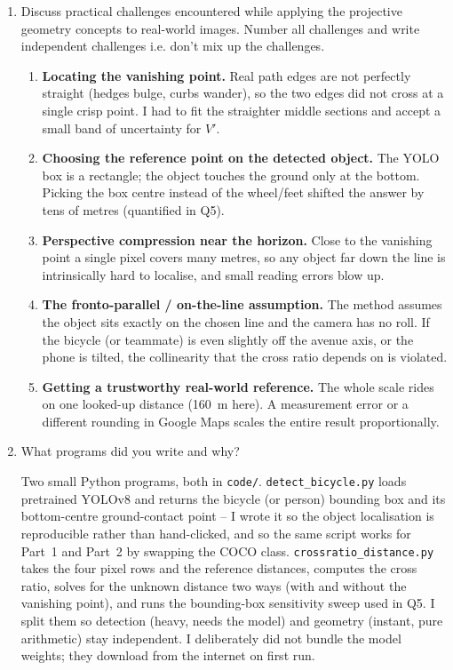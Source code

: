 \begin{enumerate}
\item Discuss practical challenges encountered while applying the projective
geometry concepts to real-world images. Number all challenges and write independent challenges i.e. don't mix up the challenges.
\begin{studentSpace}
\begin{enumerate}
\item \textbf{Locating the vanishing point.} Real path edges are not
perfectly straight (hedges bulge, curbs wander), so the two edges did not
cross at a single crisp point. I had to fit the straighter middle
sections and accept a small band of uncertainty for $V'$.
\item \textbf{Choosing the reference point on the detected object.} The
YOLO box is a rectangle; the object touches the ground only at the
bottom. Picking the box centre instead of the wheel/feet shifted the
answer by tens of metres (quantified in Q5).
\item \textbf{Perspective compression near the horizon.} Close to the
vanishing point a single pixel covers many metres, so any object far down
the line is intrinsically hard to localise, and small reading errors blow
up.
\item \textbf{The fronto-parallel / on-the-line assumption.} The method
assumes the object sits exactly on the chosen line and the camera has no
roll. If the bicycle (or teammate) is even slightly off the avenue axis,
or the phone is tilted, the collinearity that the cross ratio depends on
is violated.
\item \textbf{Getting a trustworthy real-world reference.} The whole
scale rides on one looked-up distance (160~m here). A measurement error
or a different rounding in Google Maps scales the entire result
proportionally.
\end{enumerate}
\end{studentSpace}

\item What programs did you write and why?  
\begin{studentSpace}
\noindent Two small Python programs, both in \texttt{code/}.
\texttt{detect\_bicycle.py} loads pretrained YOLOv8 and returns the
bicycle (or person) bounding box and its bottom-centre ground-contact
point -- I wrote it so the object localisation is reproducible rather
than hand-clicked, and so the same script works for Part~1 and Part~2 by
swapping the COCO class. \texttt{crossratio\_distance.py} takes the four
pixel rows and the reference distances, computes the cross ratio, solves
for the unknown distance two ways (with and without the vanishing point),
and runs the bounding-box sensitivity sweep used in Q5. I split them so
detection (heavy, needs the model) and geometry (instant, pure
arithmetic) stay independent. I deliberately did not bundle the model
weights; they download from the internet on first run.
\end{studentSpace}

\end{enumerate}

